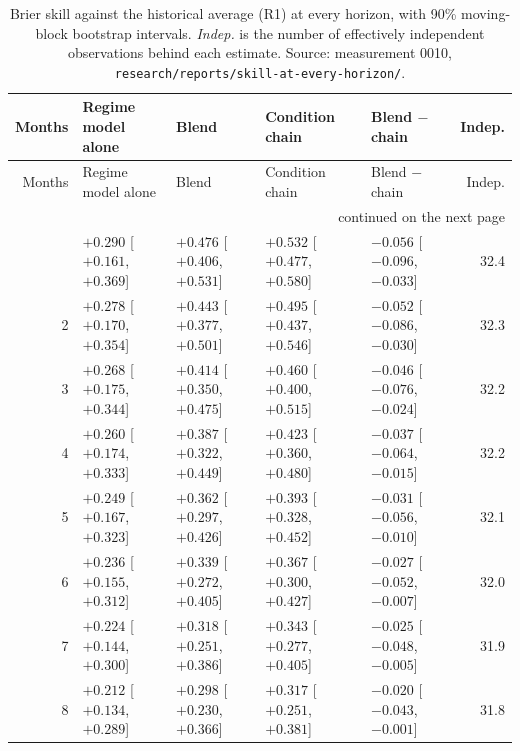 \begin{longtable}{rllllr}
\caption{Brier skill against the historical average (R1) at every horizon, with 90\% moving-block bootstrap intervals. \emph{Indep.} is the number of effectively independent observations behind each estimate. Source: measurement 0010, \texttt{research/reports/skill-at-every-horizon/}.}\label{tab:every-month}\\
\toprule
Months & Regime model alone & Blend & Condition chain & Blend $-$ chain & Indep. \\
\midrule
\endfirsthead
\toprule
Months & Regime model alone & Blend & Condition chain & Blend $-$ chain & Indep. \\
\midrule
\endhead
\midrule
\multicolumn{6}{r}{\footnotesize continued on the next page}\\
\endfoot
\bottomrule
\endlastfoot
1 & $+0.290$ {\scriptsize [$+0.161$, $+0.369$]} & $+0.476$ {\scriptsize [$+0.406$, $+0.531$]} & $+0.532$ {\scriptsize [$+0.477$, $+0.580$]} & $-0.056$ {\scriptsize [$-0.096$, $-0.033$]} & 32.4 \\
2 & $+0.278$ {\scriptsize [$+0.170$, $+0.354$]} & $+0.443$ {\scriptsize [$+0.377$, $+0.501$]} & $+0.495$ {\scriptsize [$+0.437$, $+0.546$]} & $-0.052$ {\scriptsize [$-0.086$, $-0.030$]} & 32.3 \\
3 & $+0.268$ {\scriptsize [$+0.175$, $+0.344$]} & $+0.414$ {\scriptsize [$+0.350$, $+0.475$]} & $+0.460$ {\scriptsize [$+0.400$, $+0.515$]} & $-0.046$ {\scriptsize [$-0.076$, $-0.024$]} & 32.2 \\
4 & $+0.260$ {\scriptsize [$+0.174$, $+0.333$]} & $+0.387$ {\scriptsize [$+0.322$, $+0.449$]} & $+0.423$ {\scriptsize [$+0.360$, $+0.480$]} & $-0.037$ {\scriptsize [$-0.064$, $-0.015$]} & 32.2 \\
5 & $+0.249$ {\scriptsize [$+0.167$, $+0.323$]} & $+0.362$ {\scriptsize [$+0.297$, $+0.426$]} & $+0.393$ {\scriptsize [$+0.328$, $+0.452$]} & $-0.031$ {\scriptsize [$-0.056$, $-0.010$]} & 32.1 \\
6 & $+0.236$ {\scriptsize [$+0.155$, $+0.312$]} & $+0.339$ {\scriptsize [$+0.272$, $+0.405$]} & $+0.367$ {\scriptsize [$+0.300$, $+0.427$]} & $-0.027$ {\scriptsize [$-0.052$, $-0.007$]} & 32.0 \\
7 & $+0.224$ {\scriptsize [$+0.144$, $+0.300$]} & $+0.318$ {\scriptsize [$+0.251$, $+0.386$]} & $+0.343$ {\scriptsize [$+0.277$, $+0.405$]} & $-0.025$ {\scriptsize [$-0.048$, $-0.005$]} & 31.9 \\
8 & $+0.212$ {\scriptsize [$+0.134$, $+0.289$]} & $+0.298$ {\scriptsize [$+0.230$, $+0.366$]} & $+0.317$ {\scriptsize [$+0.251$, $+0.381$]} & $-0.020$ {\scriptsize [$-0.043$, $-0.001$]} & 31.8 \\

\end{longtable}
